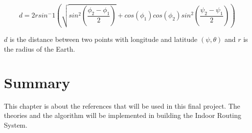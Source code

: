 \begin{equation}\label{A-star-heuristic}
d=2r sin^-1 ( \sqrt{sin^2 (\dfrac{\phi_2 - \phi_1}{2})}+cos(\phi_1)cos(\phi_2) sin^2(\dfrac{\psi_2-\psi_1}{2}))
\end{equation}

$d$ is the distance between two points with longitude and latitude $(\psi,\theta)$ and $r$ is the radius of the Earth.

\section{Summary}
This chapter is about the references that will be used in this final project. The theories and the algorithm will be implemented in building the Indoor Routing System.